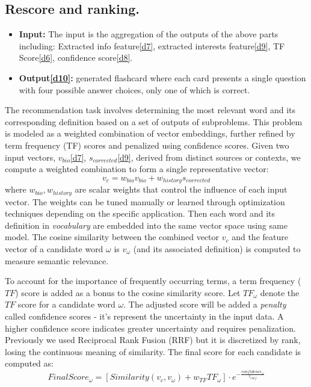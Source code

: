 \documentclass{article}
\begin{document}
\subsection{Rescore and ranking.}
\begin{itemize}
    \item \textbf{Input:} The input is the aggregation of the outputs of the above parts including: Extracted info feature\hyperref[sec:input7]{[d7]}, extracted interests feature\hyperref[sec:input9]{[d9]}, TF Score\hyperref[sec:input6]{[d6]}, confidence score\hyperref[sec:input8]{[d8]}.
    \item \textbf{Output\hyperref[sec:input10]{[d10]}: }generated flashcard where each card presents a single question with four possible answer choices, only one of which is correct.  
\end{itemize}

The recommendation task involves determining the most relevant word and its corresponding definition based on a set of outputs of subproblems. This problem is modeled as a weighted combination of vector embeddings, further refined by term frequency (TF) scores and penalized using confidence scores. Given two input vectors, $v_{bio}$\hyperref[sec:input7]{[d7]}, ${s}_{corrected}$\hyperref[sec:input9]{[d9]}, derived from distinct sources or contexts, we compute a weighted combination to form a single representative vector:
\[
    v_c = w_{bio}v_{bio}+w_{history}{s}_{corrected}
\]
where $w_{bio}, w_{history}$ are scalar weights that control the influence of each input vector. The weights can be tuned manually or learned through optimization techniques depending on the specific application. 
Then each word and its definition in \textit{vocabulary} are embedded into the same vector space using same model. The cosine similarity between the combined vector $v_{c}$ and the feature vector of a candidate word $\omega$ is $v_{\omega}$ (and its associated definition) is computed to measure semantic relevance.

To account for the importance of frequently occurring terms, a term frequency ($TF$) score is added as a bonus to the cosine similarity score. Let $TF_\omega$ denote the $TF$ score for a candidate word $\omega$. The adjusted score will be added a \textit{penalty} called confidence scores - it's represent the uncertainty in the input data. A higher confidence score indicates greater uncertainty and requires penalization. Previously we used Reciprocal Rank Fusion (RRF) but it is discretized by rank, losing the continuous meaning of similarity. The final score for each candidate is computed as:
\[
FinalScore_\omega = \left[Similarity(v_c,v_{\omega})+w_{TF}TF_{\omega}\right]\cdot e^{-\frac{confidence_\omega}{\tau_{conf}}}
\]
\end{document}
